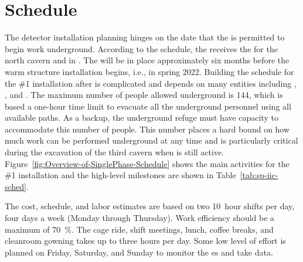 \section{Schedule}
\label{sec:sp-inst-sched}

The detector installation planning hinges on the date that the  is permitted to begin work underground. According to the   schedule, the  receives the  for  the north cavern and  in \cucbenocc{}.  The   will be in place approximately six months before the warm structure installation begins, i.e., in spring 2022. Building the schedule for the  \#1 installation after  is  complicated and depends on many entities including , , and .  The maximum number of people allowed underground is 144, which 
is based a one-hour time limit to evacuate all the underground personnel using all available paths.  As a backup, 
the  underground refuge must have capacity to accommodate this number of people. 
This number places a hard bound on how much work can be performed underground at any time and is particularly critical during the excavation of the third cavern when  is still active. Figure~\ref{fig:Overview-of-SinglePhase-Schedule} shows the main activities for the  \#1 installation and  the high-level milestones are shown in Table~\ref{tab:sp-iic-sched}.

The cost, schedule, and labor estimates are based on two \SI{10}{hour} shifts per day, four days a week (Monday through Thursday). Work efficiency should be a maximum of \SI{70}{\%}.  The cage ride, shift meetings, lunch, coffee breaks, and cleanroom gowning takes %
up to three hours per day. Some low level of effort is planned on Friday, Saturday, and Sunday to monitor the \coldbox{}es and take data. 


